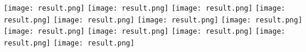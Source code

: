 \documentclass{article}
\begin{document}
	\texttt{[image: result.png]} \makebox[2mm]{}    \texttt{[image: result.png]} \makebox[2mm]{}        \texttt{[image: result.png]} \makebox[\textwidth]{}  \makebox[\textwidth]{} \makebox[\textwidth]{}  \makebox[\textwidth]{} \makebox[\textwidth]{} \makebox[\textwidth]{}  
	\texttt{[image: result.png]} \makebox[2mm]{}    \texttt{[image: result.png]} \makebox[2mm]{}        \texttt{[image: result.png]} \makebox[\textwidth]{}  \makebox[\textwidth]{} \makebox[\textwidth]{}  \makebox[\textwidth]{} \makebox[\textwidth]{} 
	\texttt{[image: result.png]} \makebox[2mm]{}    \texttt{[image: result.png]} \makebox[2mm]{}        \texttt{[image: result.png]} \makebox[\textwidth]{}  \makebox[\textwidth]{} \makebox[\textwidth]{}  \makebox[\textwidth]{} \makebox[\textwidth]{} 
	\texttt{[image: result.png]} \makebox[2mm]{}    \texttt{[image: result.png]} \makebox[2mm]{}        \texttt{[image: result.png]}
\end{document}
